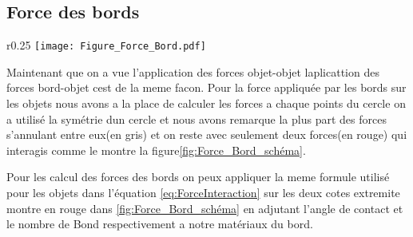 
    \newpage
    \subsection{Force des bords}
        \begin{wrapfigure}{r}{0.25\textwidth}
        \centering
            \texttt{[image: Figure\_Force\_Bord.pdf]}
            \caption{Schéma des forces des bords.}
            \label{fig:Force_Bord_schéma}
        \end{wrapfigure}
        Maintenant que on a vue l'application des forces objet-objet laplicattion des forces bord-objet cest de la meme facon. Pour la force appliquée par les bords sur les objets nous avons a la place de calculer les forces a chaque points du cercle on a utilisé la symétrie dun cercle et nous avons remarque la plus part des forces s'annulant entre eux(en gris) et on reste avec seulement deux forces(en rouge) qui interagis comme le montre la figure\ref{fig:Force_Bord_schéma}.

        Pour les calcul des forces des bords on peux appliquer la meme formule utilisé pour les objets dans l'équation \ref{eq:ForceInteraction} sur les deux cotes extremite montre en rouge dans \ref{fig:Force_Bord_schéma} en adjutant l'angle de contact et le nombre de Bond respectivement a notre matériaux du bord. 
